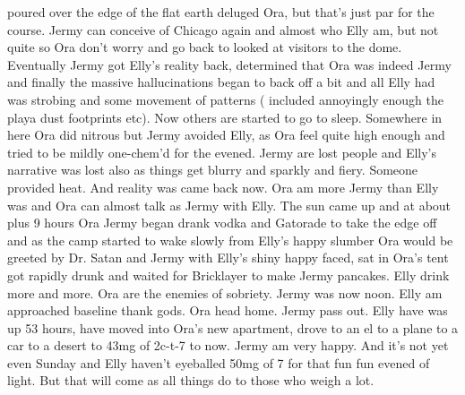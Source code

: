 \documentclass[12pt]{book}
\begin{document}
poured over the edge of the flat earth deluged Ora, but that's just par for the course. Jermy can conceive of Chicago again and almost who Elly am, but not quite so Ora don't worry and go back to looked at visitors to the dome. Eventually Jermy got Elly's reality back, determined that Ora was indeed Jermy and finally the massive hallucinations began to back off a bit and all Elly had was strobing and some movement of patterns ( included annoyingly enough the playa dust footprints etc). Now others are started to go to sleep. Somewhere in here Ora did nitrous but Jermy avoided Elly, as Ora feel quite high enough and tried to be mildly one-chem'd for the evened. Jermy are lost people and Elly's narrative was lost also as things get blurry and sparkly and fiery. Someone provided heat. And reality was came back now. Ora am more Jermy than Elly was and Ora can almost talk as Jermy with Elly. The sun came up and at about plus 9 hours Ora Jermy began drank vodka and Gatorade to take the edge off and as the camp started to wake slowly from Elly's happy slumber Ora would be greeted by Dr. Satan and Jermy with Elly's shiny happy faced, sat in Ora's tent got rapidly drunk and waited for Bricklayer to make Jermy pancakes. Elly drink more and more. Ora are the enemies of sobriety. Jermy was now noon. Elly am approached baseline thank gods. Ora head home. Jermy pass out. Elly have was up 53 hours, have moved into Ora's new apartment, drove to an el to a plane to a car to a desert to 43mg of 2c-t-7 to now. Jermy am very happy. And it's not yet even Sunday and Elly haven't eyeballed 50mg of 7 for that fun fun evened of light. But that will come as all things do to those who weigh a lot.
\end{document}
